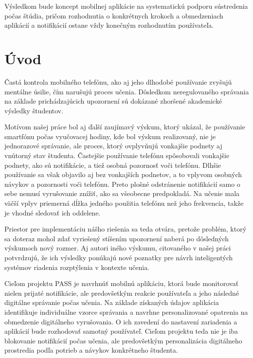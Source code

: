 \documentclass[11pt,a4paper,slovak]{article}
\begin{document}
Výsledkom bude koncept mobilnej aplikácie na systematickú podporu sústredenia počas štúdia, pričom rozhodnutia o konkrétnych krokoch a obmedzeniach aplikácií a notifikácií ostane vždy konečným rozhodnutím používateľa.

\section{Úvod}

Častá kontrola mobilného telefónu, ako aj jeho dlhodobé používanie zvyšujú mentálne úsilie, čím narušujú proces učenia. \cite[p.~40]{Liao2026} Dôsledkom neregulovaného správania na základe prichádzajúcich upozornení sú dokázané zhoršené akademické výsledky študentov. \cite[str.~18:20]{Kim2021}

Motívom našej práce bol aj ďalší zaujímavý výskum, ktorý ukázal, že používanie smartfónu počas  vyučovacej hodiny, kde bol výskum realizovaný, nie je jednorazové správanie, ale proces, ktorý ovplyvňujú vonkajšie podnety aj vnútorný stav študenta. Častejšie používanie telefónu spôsobovali vonkajšie podnety, ako sú notifikácie, a tiež osobná pozornosť voči telefónu. Dlhšie používanie sa však objavilo aj bez vonkajších podnetov, a to vplyvom osobných návykov a pozornosti voči telefónu. Preto plošné odstránenie notifikácií samo o sebe nemusí vyrušovanie znížiť, ako sa všeobecne predpokladá. Na učenie mala väčší vplyv priemerná dĺžka jedného použitia telefónu než jeho frekvencia, takže je vhodné sledovať ich oddelene. \cite[str.~41, 42]{Liao2026}

Priestor pre implementáciu nášho riešenia sa teda otvára, pretože problém, ktorý sa doteraz mohol zdať vyriešený stíšením upozornení naberá po dôsledných výskumoch nový rozmer. Aj autori iného výskumu, citovaného v našej práci potvrdzujú, že ich výsledky ponúkajú nové poznatky pre návrh inteligentých systémov riadenia rozptýlenia v kontexte učenia. \cite[str.~18:20]{Kim2021}

Cieľom projektu PASS je navrhnúť mobilnú aplikáciu, ktorá bude monitorovať nielen prijaté notifikácie, ale predovšetkým reakcie používateľa a jeho následné digitálne správanie počas učenia. Na základe získaných údajov aplikácia identifikuje individuálne vzorce správania a navrhne personalizované opatrenia na obmedzenie digitálneho vyrušovania. O ich zavedení do nastavení zariadenia a aplikácií bude rozhodovať samotný používateľ. Cieľom projektu teda nie je iba blokovanie notifikácií počas učenia, ale predovšetkým personalizácia digitálneho prostredia podľa potrieb a návykov konkrétneho študenta.
\end{document}
